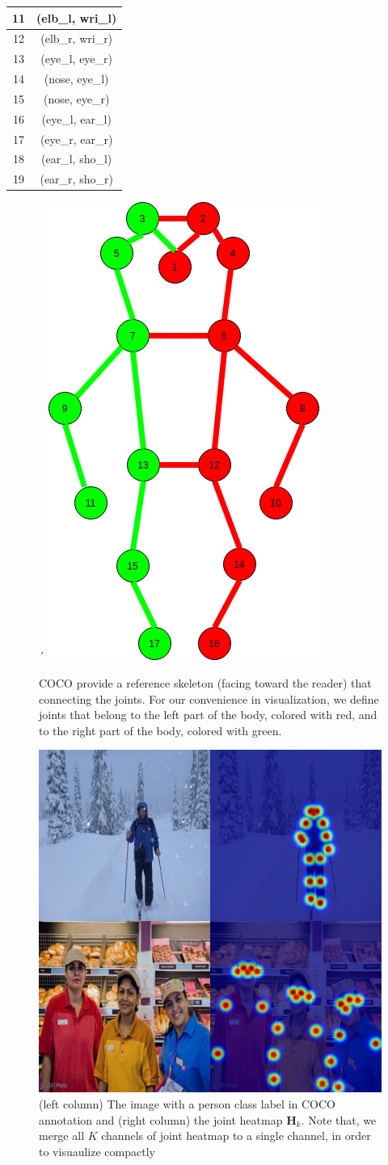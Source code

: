 \begin{table}[htpb]
\begin{tabular}{|c|c| }
		11 & (elb\_l, wri\_l)  \\ \hline
		12 & (elb\_r, wri\_r)  \\ \hline
		13 & (eye\_l, eye\_r)  \\ \hline
		14 & (nose, eye\_l)  \\ \hline
		15 & (nose, eye\_r)  \\ \hline
		16 & (eye\_l, ear\_l)  \\ \hline
		17 & (eye\_r, ear\_r)  \\ \hline
		18 & (ear\_l, sho\_l)  \\ \hline
		19 & (ear\_r, sho\_r)\\
		\bottomrule
	\end{tabular}	
\end{table}

\begin{figure}´
	\centering
	\includegraphics[width=0.3\columnwidth]{figures/ch5/coco-skeleton.png}
	\caption{COCO provide a reference skeleton (facing toward the reader) that connecting the joints. For our convenience in visualization, we define joints that belong to the left part of the body, colored with red, and to the right part of the body, colored with green.} 
	\label{fig:ch5-coco-skeleton}
\end{figure}

\begin{figure}
	\centering
	\includegraphics[width=0.5\columnwidth]{figures/ch5/coco-heatmap.png}
	\caption{(left column) The image with a person class label in COCO annotation and (right column) the joint heatmap $\mathbf{H}_k$. Note that, we merge all $K$ channels of joint heatmap to a single channel, in order to visuaulize compactly} 
	\label{fig:ch5-coco-heatmap}
\end{figure}

